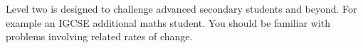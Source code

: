 Level two is designed to challenge advanced secondary students and beyond. For
example an IGCSE additional maths student. You should be familiar with problems
involving related rates of change.
